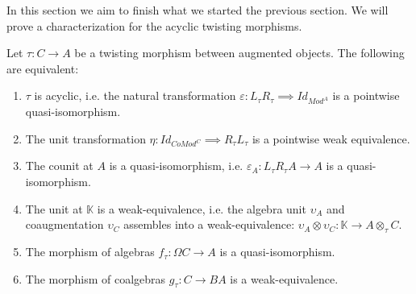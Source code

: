 \documentclass[../thesis.tex]{subfiles}
\begin{document}
            In this section we aim to finish what we started the previous section. We will prove a characterization for the acyclic twisting morphisms.

            \begin{thm}\label{thm: thm-twist}
                Let $\tau : C \rightarrow A$ be a twisting morphism between augmented objects. The following are equivalent:
                \begin{enumerate}
                    \item $\tau$ is acyclic, i.e. the natural transformation $\varepsilon : L_\tau R_\tau \implies Id_{Mod^A}$ is a pointwise quasi-isomorphism.
                    \item The unit transformation $\eta : Id_{CoMod^C} \implies R_\tau L_\tau$ is a pointwise weak equivalence.
                    \item The counit at $A$ is a quasi-isomorphism, i.e. $\varepsilon_A : L_\tau R_\tau A \rightarrow A$ is a quasi-isomorphism.
                    \item The unit at $\mathbb{K}$ is a weak-equivalence, i.e. the algebra unit $\upsilon_A$ and coaugmentation $\upsilon_C$ assembles into a weak-equivalence: $\upsilon_A \otimes \upsilon_C : \mathbb{K} \rightarrow A \otimes_\tau C$.
                    \item The morphism of algebras $f_\tau : \Omega C \rightarrow A$ is a quasi-isomorphism.
                    \item The morphism of coalgebras $g_\tau : C \rightarrow BA$ is a weak-equivalence.
                \end{enumerate}
            \end{thm}
\end{document}
